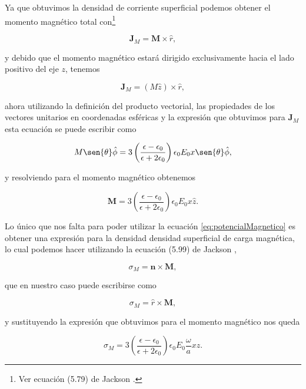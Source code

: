 \documentclass[a4paper,11pt]{article}
\numberwithin{equation}{section}
\begin{document}
Ya que obtuvimos la densidad de corriente superficial podemos obtener el momento 
magnético total con\footnote{Ver ecuación (5.79) de Jackson \cite{jackson}.}

\begin{equation}
  \mathbf{J}_M = \mathbf{M} \times \hat{r},
\end{equation}

y debido que el momento magnético estará dirigido exclusivamente hacia el lado positivo 
del eje $z$, tenemos 

\begin{equation}
  \mathbf{J}_M = (M\hat{z}) \times \hat{r},
\end{equation}

ahora utilizando la definición del producto vectorial, las propiedades de los vectores 
unitarios en coordenadas esféricas y la expresión que obtuvimos para 
$ \mathbf{J}_M$ esta ecuación se puede escribir como 

\begin{equation}
 M \sen{\theta}\hat{\phi} =  3\left(\frac{\epsilon - \epsilon_0}{\epsilon + 2\epsilon_0}
 \right)\epsilon_0E_0 x \sen{\theta} \hat{\phi},
\end{equation}

y resolviendo para el momento magnético obtenemos 

\begin{equation}
 \mathbf{M} =  3\left(\frac{\epsilon - \epsilon_0}{\epsilon + 2\epsilon_0}
 \right)\epsilon_0E_0 x \hat{z}.
\end{equation}

Lo único que nos falta para poder utilizar la ecuación \eqref{eq:potencialMagnetico}
es obtener una expresión para la densidad  densidad superficial de carga magnética, lo 
cual podemos hacer utilizando la ecuación (5.99) de Jackson \cite{jackson}, 

\begin{equation}
 \sigma_M = \mathbf{n} \times \mathbf{M},
\end{equation}

que en nuestro caso puede escribirse como 

\begin{equation}
 \sigma_M = \hat{r} \times \mathbf{M},
\end{equation}

y sustituyendo la expresión que obtuvimos para el momento magnético nos queda

\begin{equation}
 \sigma_M = 3\left(\frac{\epsilon - \epsilon_0}{\epsilon + 2\epsilon_0}
 \right)\epsilon_0E_0 \frac{\omega}{a} xz.
\end{equation}
\end{document}
